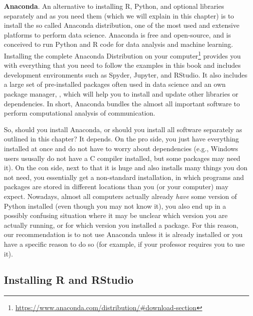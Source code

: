 \begin{feature}\textbf{Anaconda}. An alternative to installing 
  R, Python, and optional libraries separately and as you need them
  (which we will explain in this chapter) is to install the so called
  Anaconda distribution, one of the most used and extensive platforms
  to perform data science. Anaconda is free and open-source, and is
  conceived to run Python and R code for data analysis and machine
  learning. Installing the complete Anaconda Distribution on your
  computer\footnote{\url{https://www.anaconda.com/distribution/\#download-section}}
  provides you with everything that you need to follow the examples in
  this book and includes development environments such as Spyder,
  Jupyter, and RStudio. It also includes a large set of pre-installed
  packages often used in data science and an own package manager,
  , which will help you to install and update other
  libraries or dependencies. In short, Anaconda bundles the almost all
  important software to perform computational analysis of
  communication.

  So, should you install Anaconda, or should you
  install all software separately as outlined in this chapter? It
  depends. On the pro side, you just have everything installed at once and do
  not have to worry about dependencies (e.g., Windows users ususally
  do not have a C compiler installed, but some packages may need
  it). On the con side, next to that it is huge and also installs many
  things you don not need, you essentially get a non-standard
  installation, in which programs and packages are stored in different
  locations than you (or your computer) may expect. Nowadays, almost all computers
  actually already \emph{have} some version of Python installed (even though you may
  not know it), you also end up in a possibly confusing situation
  where it may be unclear which version you are actually running, or
  for which version you installed a package.
  For this reason, our recommendation is to not use Anaconda unless
  it is already installed or you have a specific reason to do so
  (for example, if your professor requires you to use it).
\end{feature}

\subsection{Installing R and RStudio}

